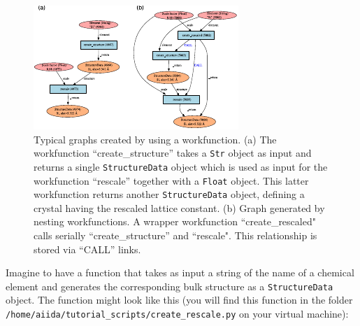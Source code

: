 \begin{figure}[!th]
\centering
 \includegraphics[width=\linewidth]{img/workfunctions}
 \caption{ \label{Fig:workfunctions}Typical graphs created by using a workfunction. (a) The workfunction ``create\_structure'' takes a \texttt{Str} object as input and returns a single \texttt{StructureData} object which is used as input for the workfunction ``rescale'' together with a \texttt{Float} object. This latter workfunction returns another \texttt{StructureData} object, defining a crystal having the rescaled lattice constant. (b) Graph generated by nesting workfunctions. A wrapper workfunction ``create\_rescaled" calls serially ``create\_structure'' and ``rescale". This relationship is stored via ``CALL'' links.}
\end{figure}


Imagine to have a function that takes as input a string of the name of a chemical element and generates the corresponding bulk structure as a \texttt{StructureData} object. The function might look like this (you will find this function in the folder \texttt{/home/aiida/tutorial\_scripts/create\_rescale.py} on your virtual machine):

